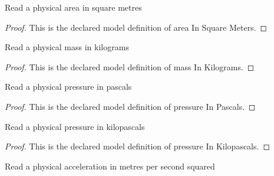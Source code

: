 \begin{definition}
  \label{def:physics:phyx-mini-0381:phyxminiproblems-problemphyxmini0381-areainsquaremeters}
  Read a physical area in square metres
\end{definition}
\begin{proof}
  This is the declared model definition of area In Square Meters.
\end{proof}
\begin{definition}
  \label{def:physics:phyx-mini-0381:phyxminiproblems-problemphyxmini0381-massinkilograms}
  Read a physical mass in kilograms
\end{definition}
\begin{proof}
  This is the declared model definition of mass In Kilograms.
\end{proof}
\begin{definition}
  \label{def:physics:phyx-mini-0381:phyxminiproblems-problemphyxmini0381-pressureinpascals}
  Read a physical pressure in pascals
\end{definition}
\begin{proof}
  This is the declared model definition of pressure In Pascals.
\end{proof}
\begin{definition}
  \label{def:physics:phyx-mini-0381:phyxminiproblems-problemphyxmini0381-pressureinkilopascals}
  Read a physical pressure in kilopascals
\end{definition}
\begin{proof}
  This is the declared model definition of pressure In Kilopascals.
\end{proof}
\begin{definition}
  \label{def:physics:phyx-mini-0381:phyxminiproblems-problemphyxmini0381-accelerationinmeterspersecondsquared}
  Read a physical acceleration in metres per second squared
\end{definition}

